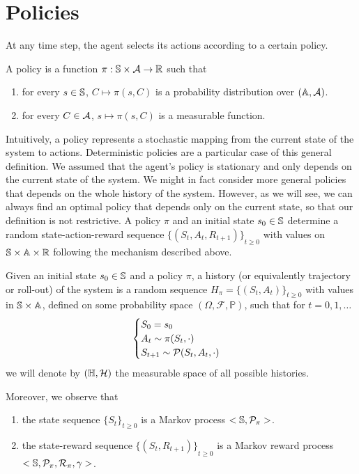 \section{Policies}
At any time step, the agent selects its actions according to a certain policy. 
\begin{definition}[Policy]
	A policy is a function $\pi: \S \times \calA \to \R$ such that
	\begin{enumerate}[label={\roman*)}]
		\item for every $s \in \S$, $C \mapsto \pi(s,C)$ is a probability
			  distribution over $(\A, \calA)$. 
		\item for every $C \in \calA$, $s \mapsto \pi(s, C)$ is a measurable
			  function. 
	\end{enumerate}
\end{definition}
Intuitively, a policy represents a stochastic mapping from the current state of
the system to actions. Deterministic policies are a particular case of this 
general definition. We assumed that the agent's policy is stationary and only
depends on the current state of the system. We might in fact  consider more 
general policies that depends on the whole history of the system. However, as
we will see, we can always find an optimal policy that depends only on the
current state, so that our definition is not restrictive. A policy $\pi$ and an
initial state $s_0 \in \S$ determine a random state-action-reward sequence
${\{(S_t, A_t, R_{t+1})\}}_{t\geq 0}$ with values on $\S \times \A \times \R$
following the mechanism described above. 
\begin{definition}[History]
	Given an initial state $s_0 \in \S$ and a policy $\pi$, a history (or
	equivalently trajectory or roll-out) of the system is a random sequence
	$H_\pi = {\{(S_t, A_t)\}}_{t\geq 0}$ with values in $\S \times \A$, defined
	on some probability space $(\Omega, \mathcal{F}, \mathbb{P})$, such that for 
	$t = 0, 1, \ldots$
	\begin{equation*}
		\begin{cases}
			S_0 = s_0\\
			A_t \sim \pi(S_t, \cdot)\\
			S_{t+1} \sim \calP(S_t, A_t, \cdot)\\
		\end{cases}
	\end{equation*}
	we will denote by $(\H, \calH)$ the measurable space of all possible
	histories. 
\end{definition}
Moreover, we observe that
\begin{enumerate}[label={\roman*)}]
	\item the state sequence ${\{S_t\}}_{t\geq 0}$ is a Markov process $<\S,
		  \calP_\pi>$.
	  \item the state-reward sequence ${\{(S_t, R_{t+1})\}}_{t\geq 0}$ is a Markov 
		  reward process $<\S, \calP_\pi, \calR_\pi, \gamma>$.
\end{enumerate}
